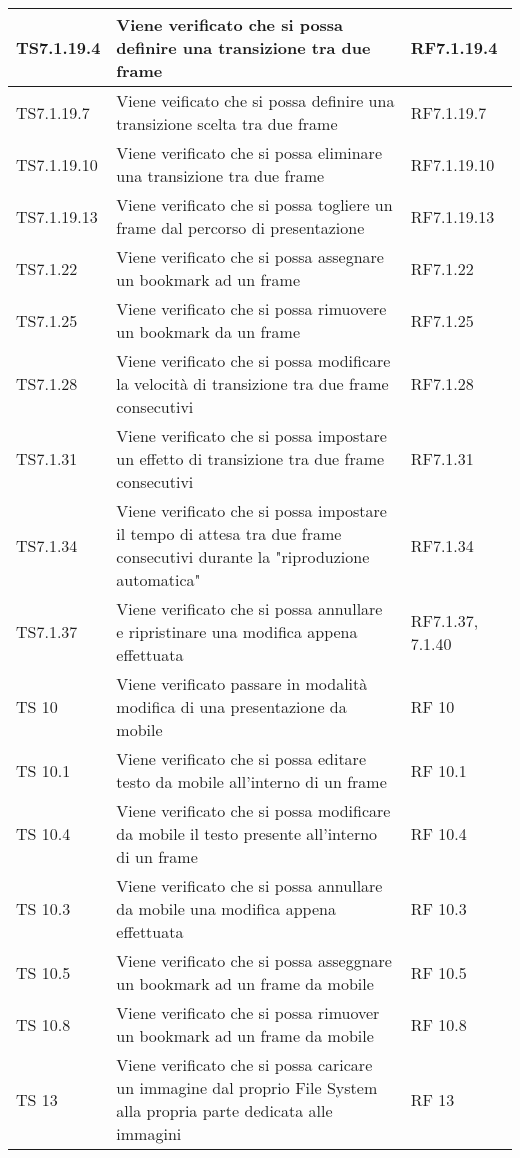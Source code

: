 {{\begin{longtable} [c]{| p{3cm} | p{6cm} |p{3cm}|}
			TS7.1.19.4 & Viene verificato che si possa definire una transizione tra due frame & RF7.1.19.4\\
			\hline
			TS7.1.19.7 & Viene veificato che si possa definire una transizione scelta tra due frame & RF7.1.19.7\\
			\hline
			TS7.1.19.10 & Viene verificato che si possa eliminare una transizione tra due frame & RF7.1.19.10\\
			\hline
			TS7.1.19.13 & Viene verificato che si possa togliere un frame dal percorso di presentazione & RF7.1.19.13\\
			\hline
			TS7.1.22 & Viene verificato che si possa assegnare un bookmark ad un frame & RF7.1.22\\
			\hline
			TS7.1.25 & Viene verificato che si possa rimuovere un bookmark da un frame & RF7.1.25\\
			\hline
			TS7.1.28 & Viene verificato che si possa modificare la velocità di transizione tra due frame consecutivi & RF7.1.28\\
			\hline
			TS7.1.31 & Viene verificato che si possa impostare un effetto di transizione tra due frame consecutivi & RF7.1.31\\
			\hline
			TS7.1.34 & Viene verificato che si possa impostare il tempo di attesa tra due frame consecutivi durante la "riproduzione automatica" & RF7.1.34\\
			\hline
			TS7.1.37 & Viene verificato che si possa annullare e ripristinare una modifica appena effettuata & RF7.1.37, 7.1.40\\
			\hline			 
			TS 10 & Viene verificato passare in modalità modifica di una presentazione da mobile & RF 10\\
			\hline
			TS 10.1 & Viene verificato che si possa editare testo da mobile all'interno di un frame & RF 10.1\\
			\hline
			TS 10.4 & Viene verificato che si possa modificare da mobile il testo presente all'interno di un frame & RF 10.4\\
			\hline
			TS 10.3 & Viene verificato che si possa annullare da mobile una modifica appena effettuata & RF 10.3\\
			\hline
			TS 10.5 & Viene verificato che si possa asseggnare un bookmark ad un frame da mobile & RF 10.5\\
			\hline
			TS 10.8 & Viene verificato che si possa rimuover un bookmark ad un frame da mobile & RF 10.8\\
			\hline
			TS 13 & Viene verificato che si possa caricare un immagine dal proprio File System alla propria parte dedicata alle immagini & RF 13\\

\end{longtable}}}
